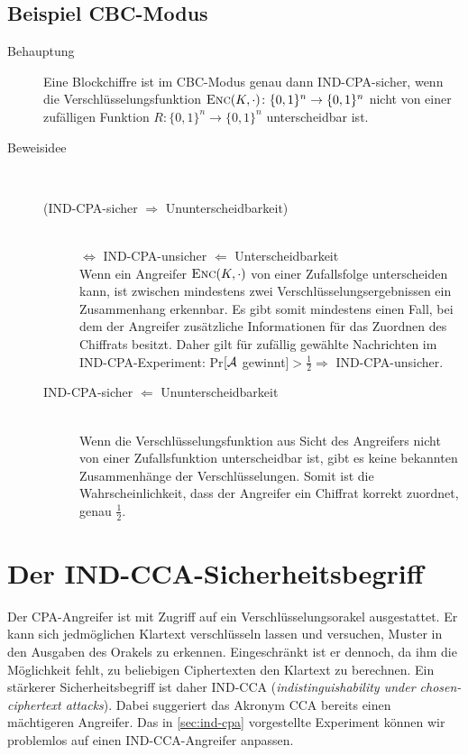 \subsection{Beispiel CBC-Modus} 
\begin{description}
\item[Behauptung] Eine Blockchiffre ist im CBC-Modus\indexCBC
  genau dann IND-CPA-sicher, wenn die Verschlüsselungsfunktion
  $\textsc{Enc}(K,\cdot) \colon \{0,1\}^n \rightarrow \{0,1\}^n$ nicht von
  einer zufälligen Funktion $R \colon \{0,1\}^n \rightarrow \{0,1\}^n$
  unterscheidbar ist.
\item[Beweisidee]~
  \begin{description}
  \item[(IND-CPA-sicher $\Rightarrow$
    Ununterscheidbarkeit)]~\\ $\Leftrightarrow$ IND-CPA-unsicher
    $\Leftarrow$ Unterscheidbarkeit~\\ Wenn ein Angreifer $\textsc{Enc}(K,
    \cdot)$ von einer Zufallsfolge unterscheiden kann, ist zwischen
    mindestens zwei Verschlüsselungsergebnissen ein Zusammenhang
    erkennbar. Es gibt somit mindestens einen Fall, bei dem der Angreifer
    zusätzliche Informationen für das Zuordnen des Chiffrats besitzt. Daher
    gilt für zufällig gewählte Nachrichten im IND-CPA-Experiment: Pr$[\mathcal{A}$
    gewinnt$] > \frac{1}{2} \Rightarrow$ IND-CPA-unsicher.
  \item[IND-CPA-sicher $\Leftarrow$
    Ununterscheidbarkeit]~\\ Wenn die Verschlüsselungsfunktion aus Sicht des
    Angreifers nicht von einer Zufallsfunktion unterscheidbar ist, gibt es
    keine bekannten Zusammenhänge der Verschlüsselungen. Somit ist die
    Wahrscheinlichkeit, dass der Angreifer ein Chiffrat korrekt zuordnet,
    genau $\frac{1}{2}$.
  \end{description}
\end{description}

\section{Der IND-CCA-Sicherheitsbegriff}\label{sec:ind-cca} Der
CPA-Angreifer ist mit Zugriff auf ein Verschlüsselungsorakel
ausgestattet. Er kann sich jedmöglichen Klartext verschlüsseln lassen
und versuchen, Muster in den Ausgaben des Orakels zu
erkennen. Eingeschränkt ist er dennoch, da ihm die Möglichkeit fehlt, zu
beliebigen Ciphertexten den Klartext zu berechnen. Ein stärkerer
Sicherheitsbegriff ist daher IND-CCA (\emph{indistinguishability under
  chosen-ciphertext attacks})\indexINDCCA. Dabei suggeriert das Akronym
CCA bereits einen mächtigeren Angreifer. Das in \ref{sec:ind-cpa}
vorgestellte Experiment können wir problemlos auf einen
IND-CCA-Angreifer anpassen.

